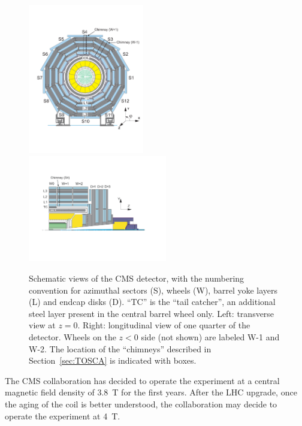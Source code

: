 \begin{figure}[hbt]
  \begin{center}
    \includegraphics[width=0.45\textwidth]{fig/transverse4}%
    \hfill
    \includegraphics[width=0.54\textwidth]{fig/longitudinal_3}%
    \hfill
    \caption{Schematic views of the CMS detector, with the numbering
      convention for azimuthal sectors (S), wheels (W), barrel yoke layers (L)
      and endcap disks (D). ``TC'' is the ``tail catcher'', an
      additional steel layer present in the central barrel wheel only.
      Left: transverse view at $z=0$. Right:
      longitudinal view of one quarter of the detector.
      Wheels on the $z<0$ side (not shown) are labeled W-1 and
      W-2. The location of the ``chimneys'' described in
      Section~\ref{sec:TOSCA} is indicated with boxes.}
    \label{fig:Sectors}
  \end{center}
\end{figure}

The CMS collaboration has decided to operate the experiment at a
central magnetic field density of 3.8~T for the first years. After the
LHC upgrade, once the aging of the coil is better understood, the
collaboration may decide to operate the experiment at 4~T. 

